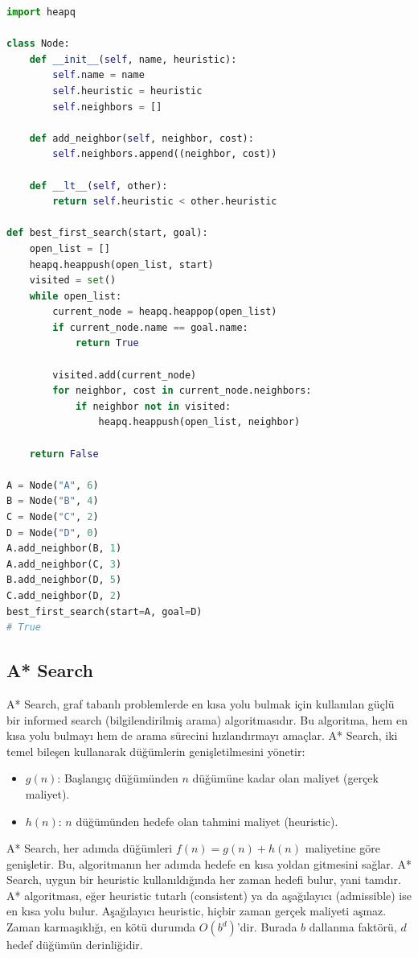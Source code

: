\begin{lstlisting}[language=Python]
import heapq

class Node:
    def __init__(self, name, heuristic):
        self.name = name
        self.heuristic = heuristic
        self.neighbors = []

    def add_neighbor(self, neighbor, cost):
        self.neighbors.append((neighbor, cost))

    def __lt__(self, other):
        return self.heuristic < other.heuristic

def best_first_search(start, goal):
    open_list = []
    heapq.heappush(open_list, start)
    visited = set()
    while open_list:
        current_node = heapq.heappop(open_list)
        if current_node.name == goal.name:
            return True
        
        visited.add(current_node)
        for neighbor, cost in current_node.neighbors:
            if neighbor not in visited:
                heapq.heappush(open_list, neighbor)
    
    return False

A = Node("A", 6)
B = Node("B", 4)
C = Node("C", 2)
D = Node("D", 0)
A.add_neighbor(B, 1)
A.add_neighbor(C, 3)
B.add_neighbor(D, 5)
C.add_neighbor(D, 2)
best_first_search(start=A, goal=D)
# True
\end{lstlisting}

\newpage

\subsection{A* Search}
A* Search, graf tabanlı problemlerde en kısa yolu bulmak için kullanılan güçlü bir informed search (bilgilendirilmiş arama) algoritmasıdır. Bu algoritma, hem en kısa yolu bulmayı hem de arama sürecini hızlandırmayı amaçlar. A* Search, iki temel bileşen kullanarak düğümlerin genişletilmesini yönetir:

\begin{itemize}
    \item $g(n)$: Başlangıç düğümünden $n$ düğümüne kadar olan maliyet (gerçek maliyet).
    \item $h(n)$: $n$ düğümünden hedefe olan tahmini maliyet (heuristic).
\end{itemize}

A* Search, her adımda düğümleri $f(n) = g(n) + h(n)$ maliyetine göre genişletir. Bu, algoritmanın her adımda hedefe en kısa yoldan gitmesini sağlar. A* Search, uygun bir heuristic kullanıldığında her zaman hedefi bulur, yani tamdır. A* algoritması, eğer heuristic tutarlı (consistent) ya da aşağılayıcı (admissible) ise en kısa yolu bulur. Aşağılayıcı heuristic, hiçbir zaman gerçek maliyeti aşmaz. Zaman karmaşıklığı, en kötü durumda $O(b^d)$'dir. Burada $b$ dallanma faktörü, $d$ hedef düğümün derinliğidir.


